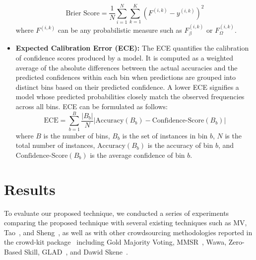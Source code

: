 \documentclass[sn-nature]{bst/sn-jnl}
\begin{document}
\begin{itemize}
    \begin{equation}
        \text{Brier Score} = \frac{1}{N} \sum_{i=1}^{N} \sum_{k=1}^{K} {\left(F^{(i,k)} - y^{(i,k)}\right)}^2
    \end{equation}
where $F^{(i,k)}$ can be any probabilistic measure such as $F_{\beta}^{(i,k)}$ or $F_{\Omega}^{(i,k)}$.
    \item \textbf{Expected Calibration Error (ECE):}  The ECE quantifies the calibration of  confidence scores produced by a model. It is computed as a weighted average of the absolute differences between the actual accuracies and the predicted confidences within each bin when predictions are grouped into distinct bins based on their predicted confidence. A lower ECE signifies a model whose predicted probabilities closely match the observed frequencies across all bins. ECE can be formulated as follows:
    \begin{equation}
        \text{ECE} = \sum_{b=1}^{B} \frac{ \vert B_b \vert }{N} \left\vert {\text{Accuracy} ( B_{b} ) - \text{Confidence-Score}(B_b)} \right\vert
    \end{equation}
    where $B$ is the number of bins, $B_b$ is the set of instances in bin $b$, $N$ is the total number of instances, $\text{Accuracy} (B_b)$ is the accuracy of bin $b$, and $\text{Confidence-Score} (B_b)$ is the average confidence of bin $b$.
\end{itemize}
\section{Results}\label{sec:crowd.results}
To evaluate our proposed technique, we conducted a series of experiments comparing the proposed technique with several existing techniques such as MV, Tao~\cite{tao_Label_2020}, and Sheng~\cite{sheng_Majority_2019}, as well as with other crowdsourcing methodologies reported in the crowd-kit package~\cite{ustalov_learning_2021} including Gold Majority Voting, MMSR~\cite{ma_Adversarial_2020}, Wawa, Zero-Based Skill, GLAD~\cite{whitehill_Whose_2009}, and Dawid Skene~\cite{dawid_Maximum_1979}.
\end{document}
